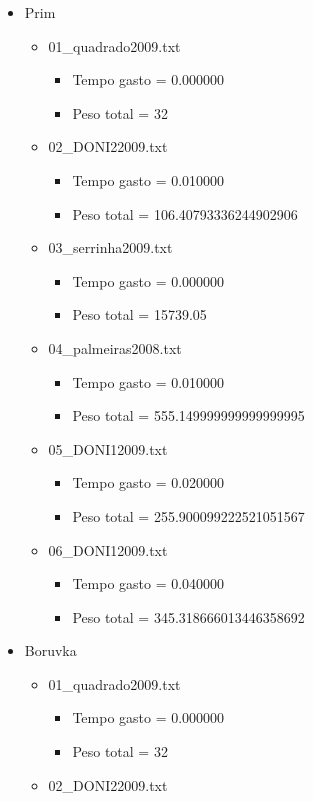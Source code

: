 \documentclass[12pt,a4paper]{article}
\begin{document}
\begin{itemize}
\begin{itemize}
\end{itemize}
\item Prim 
\begin{itemize}
\item 01\_quadrado2009.txt
\begin{itemize}
\item Tempo gasto = 0.000000 
\item Peso total = 32
\end{itemize}
\item 02\_DONI22009.txt
\begin{itemize}
\item Tempo gasto = 0.010000 
\item Peso total = 106.40793336244902906 
\end{itemize}
\item 03\_serrinha2009.txt
\begin{itemize}
\item Tempo gasto = 0.000000 
\item Peso total = 15739.05 
\end{itemize}
\item 04\_palmeiras2008.txt
\begin{itemize}
\item Tempo gasto = 0.010000 
\item Peso total = 555.149999999999999995 
\end{itemize}
\item 05\_DONI12009.txt
\begin{itemize}
\item Tempo gasto = 0.020000 
\item Peso total = 255.900099222521051567 
\end{itemize}
\item 06\_DONI12009.txt
\begin{itemize}
\item Tempo gasto = 0.040000 
\item Peso total = 345.318666013446358692 
\end{itemize}
\end{itemize}
\item Boruvka
\begin{itemize}
\item 01\_quadrado2009.txt
\begin{itemize}
\item Tempo gasto = 0.000000
\item Peso total = 32
\end{itemize}
\item 02\_DONI22009.txt

\end{itemize}
\end{itemize}
\end{document}
